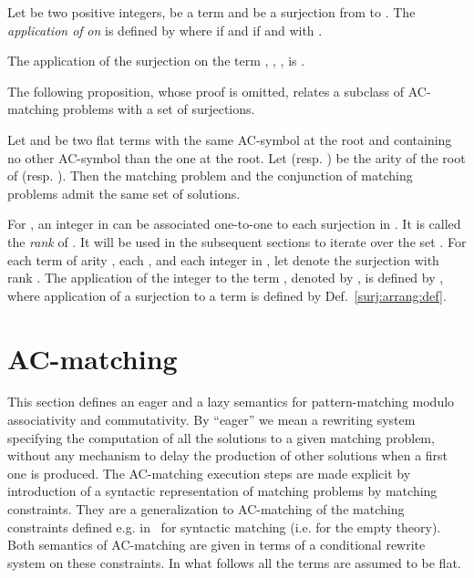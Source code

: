 \documentclass[submission,copyright,creativecommons]{eptcs}
\numberwithin{subcase}{case}
\begin{document}
\begin{definition}
\label{surj:arrang:def}
Let  be two positive integers,  be a term
 and  be a surjection from  to
 . The \emph{application of}
 \emph{on}  is defined by  where  if
 and  if  and   with 
.
\end{definition}

\begin{example}
\label{surj:appli:ex}
The application of the surjection  on the term , , ,  is
 .
\end{example}

The following proposition, whose proof is omitted, relates a subclass of
AC-matching problems with a set of surjections.
\begin{proposition}
\label{prop:matching:surj}
Let  and  be two flat terms with the same AC-symbol at the root and
containing no other AC-symbol than the one at the root. Let  (resp. ) be
the arity of the root of  (resp. ). Then the matching problem
 and the conjunction of matching problems  admit the same set of solutions.
\end{proposition}


For , an integer  in 
can be associated one-to-one to each surjection  in . It is called
the \emph{rank} of .  It will be used in the subsequent sections to iterate
over the set .
For each term  of arity , each , and each integer
 in , let  denote the surjection
with rank . The application of the integer  to the term , denoted by
, is defined by , where application of a
surjection to a term is defined by Def.~\ref{surj:arrang:def}.

\section{AC-matching}
\label{ac:match:sec}
This section defines an eager and a lazy semantics for pattern-matching modulo
associativity and commutativity. By ``eager'' we mean a rewriting system
specifying the computation of all the solutions to a given matching problem,
without any mechanism to delay the production of other solutions when a first one
is produced. The AC-matching execution steps are made explicit by introduction of
a syntactic representation of matching problems by matching constraints. They are
a generalization to AC-matching of the matching constraints defined e.g.
in~\cite{CFK07} for syntactic matching (i.e. for the empty theory). Both
semantics of AC-matching are given in terms of a conditional rewrite system on
these constraints. In what follows all the terms are assumed to be flat.
\end{document}
